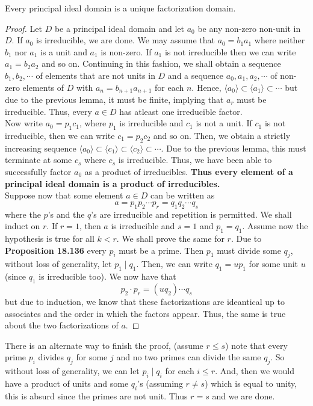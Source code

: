 \begin{proposition}
	Every principal ideal domain is a unique factorization domain.
\end{proposition}
\begin{proof}
	Let $D$ be a principal ideal domain and let $a_0$ be any non-zero non-unit in $D$. If $a_0$ is irreducible, we are done. We may assume that $a_0=b_1a_1$ where neither $b_1$ nor $a_1$ is a unit and $a_1$ is non-zero. If $a_1$ is not irreducible then we can write $a_1=b_2a_2$ and so on. Continuing in this fashion, we shall obtain a sequence $b_1,b_2,\cdots$ of elements that are not units in $D$ and a sequence $a_0,a_1,a_2,\cdots$ of non-zero elements of $D$ with $a_n=b_{n+1}a_{n+1}$ for each $n$. Hence, $\langle a_0\rangle\subset\langle a_1\rangle\subset\cdots$ but due to the previous lemma, it must be finite, implying that $a_r$ must be irreducible. Thus, every $a\in D$ has atleast one irreducible factor.\\
	Now write $a_0=p_1c_1$, where $p_1$ is irreducible and $c_1$ is not a unit. If $c_1$ is not irreducible, then we can write $c_1=p_2c_2$ and so on. Then, we obtain a strictly increasing sequence $\langle a_0\rangle\subset\langle c_1\rangle\subset\langle c_2\rangle\subset\cdots$. Due to the previous lemma, this must terminate at some $c_s$ where $c_s$ is irreducible. Thus, we have been able to successfully factor $a_0$ as a product of irreducibles. \textbf{Thus every element of a principal ideal domain is a product of irreducibles.}\\
	Suppose now that some element $a\in D$ can be written as
	$$
	a = p_1p_2\cdots p_r = q_1q_2\cdots q_s
	$$
	where the $p$'s and the $q$'s are irreducible and repetition is permitted. We shall induct on $r$. If $r=1$, then $a$ is irreducible and $s=1$ and $p_1=q_1$. Assume now the hypothesis is true for all $k<r$. We shall prove the same for $r$. Due to \textbf{Proposition 18.136} every $p_i$ must be a prime. Then $p_1$ must divide some $q_j$, without loss of generality, let $p_1\mid q_1$. Then, we can write $q_1=up_1$ for some unit $u$ (since $q_1$ is irreducible too). We now have that 
	$$
	p_2\cdot p_r = (uq_2)\cdots q_s
	$$
	but due to induction, we know that these factorizations are ideantical up to associates and the order in which the factors appear. Thus, the same is true about the two factorizations of $a$.
\end{proof}

There is an alternate way to finish the proof, (assume $r\le s$) note that every prime $p_i$ divides $q_j$ for some $j$ and no two primes can divide the same $q_j$. So without loss of generality, we can let $p_i\mid q_i$ for each $i\le r$. And, then we would have a product of units and some $q_i$'s (assuming $r\ne s$) which is equal to unity, this is absurd since the primes are not unit. Thus $r=s$ and we are done.\\

